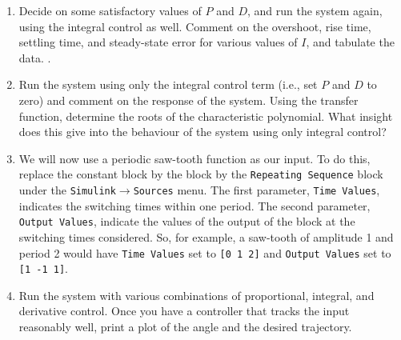 \begin{enumerate}
\item\label{step:5} Decide on some satisfactory values of $P$ and $D$\@, and run the
system again, using the integral control as well.  Comment on the overshoot,
rise time, settling time, and steady-state error for various values of
$I$\@, and tabulate the data. .

\item Run the system using only the integral control term (i.e., set $P$ and
$D$ to zero) and comment on the response of the system.  Using the
transfer function, determine the roots of the characteristic polynomial.
What insight does this give into the behaviour of the system using only
integral control?

\item We will now use a periodic saw-tooth function as our input.  To do
this, replace the constant block by the block by the
\verb|Repeating Sequence| block under the
\verb|Simulink|$\rightarrow$\verb|Sources| menu.  The first parameter,
\verb|Time Values|, indicates the switching times within one period.  The
second parameter, \verb|Output Values|, indicate the values of the output of
the block at the switching times considered.  So, for example, a saw-tooth of
amplitude 1 and period 2 would have \verb|Time Values| set to \verb|[0 1 2]|
and \verb|Output Values| set to \verb|[1 -1 1]|.

\item Run the system with various combinations of proportional, integral, and
derivative control.  Once you have a controller that tracks the input
reasonably well, print a plot of the angle and the desired trajectory. 


\end{enumerate}
